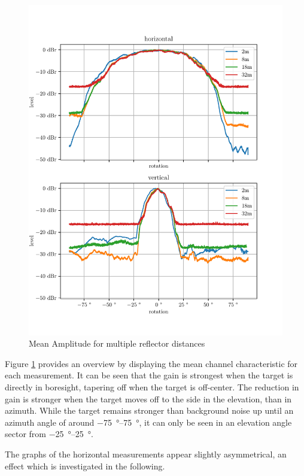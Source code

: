 \begin{figure}
    \centering
    \includegraphics[width=\textwidth]{../figures/mean_amp.pdf}
    \caption{Mean Amplitude for multiple reflector distances}
    \label{fig:mean_amp}
\end{figure}

Figure \ref{fig:mean_amp} provides an overview by displaying the mean channel characteristic for each measurement.
It can be seen that the gain is strongest when the target is directly in boresight,
tapering off when the target is off-center. The reduction in gain is stronger when the target
moves off to the side in the elevation, than in azimuth. While the target remains stronger
than background noise up until an azimuth angle of around \SIrange{-75}{+75}{\degree},
it can only be seen in an elevation angle sector from \SIrange{-25}{+25}{\degree}.

The graphs of the horizontal measurements appear slightly asymmetrical, an effect which is investigated in the following. \\

